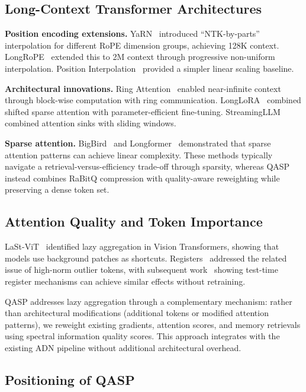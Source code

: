 \documentclass[twocolumn]{article}
\begin{document}
\subsection{Long-Context Transformer Architectures}

\textbf{Position encoding extensions.} YaRN~\cite{yarn} introduced ``NTK-by-parts'' interpolation for different RoPE dimension groups, achieving 128K context. LongRoPE~\cite{longrope} extended this to 2M context through progressive non-uniform interpolation. Position Interpolation~\cite{positioninterp} provided a simpler linear scaling baseline.

\textbf{Architectural innovations.} Ring Attention~\cite{ringattention} enabled near-infinite context through block-wise computation with ring communication. LongLoRA~\cite{longlora} combined shifted sparse attention with parameter-efficient fine-tuning. StreamingLLM~\cite{streamingllm} combined attention sinks with sliding windows.

\textbf{Sparse attention.} BigBird~\cite{bigbird} and Longformer~\cite{longformer} demonstrated that sparse attention patterns can achieve linear complexity. These methods typically navigate a retrieval-versus-efficiency trade-off through sparsity, whereas QASP instead combines RaBitQ compression with quality-aware reweighting while preserving a dense token set.

\subsection{Attention Quality and Token Importance}

LaSt-ViT~\cite{lastvit} identified lazy aggregation in Vision Transformers, showing that models use background patches as shortcuts. Registers~\cite{registers} addressed the related issue of high-norm outlier tokens, with subsequent work~\cite{testtimeregisters} showing test-time register mechanisms can achieve similar effects without retraining.

QASP addresses lazy aggregation through a complementary mechanism: rather than architectural modifications (additional tokens or modified attention patterns), we reweight existing gradients, attention scores, and memory retrievals using spectral information quality scores. This approach integrates with the existing ADN pipeline without additional architectural overhead.

\subsection{Positioning of QASP}
\end{document}
